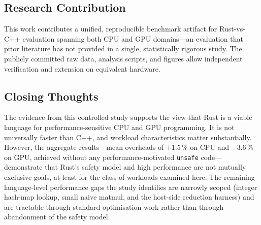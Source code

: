 \documentclass{article}
\begin{document}
\subsection{Research Contribution}

This work contributes a unified, reproducible benchmark artifact for
Rust-vs-C++ evaluation spanning both CPU and GPU domains---an evaluation
that prior literature has not provided in a single, statistically rigorous
study.
The publicly committed raw data, analysis scripts, and figures allow
independent verification and extension on equivalent hardware.

\subsection{Closing Thoughts}

The evidence from this controlled study supports the view that Rust is
a viable language for performance-sensitive CPU and GPU programming.
It is not universally faster than C++, and workload characteristics
matter substantially.
However, the aggregate results---mean overheads of $+$1.5\,\%
on CPU and $-$3.6\,\% on GPU, achieved without any
performance-motivated \texttt{unsafe} code---demonstrate that Rust's
safety model and high performance are not mutually exclusive goals,
at least for the class of workloads examined here.
The remaining language-level performance gaps the study identifies are
narrowly scoped (integer hash-map lookup, small naive matmul, and the
host-side reduction harness) and are tractable through standard
optimisation work rather than through abandonment of the safety
model.

\medskip
\printbibliography
\end{document}
